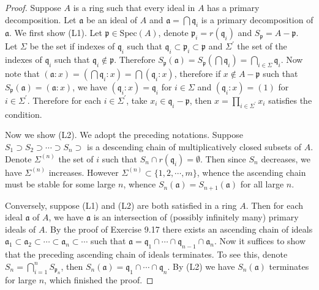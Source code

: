 \begin{proof}
Suppose $A$ is a ring such that every ideal in $A$ has a primary decomposition. Let $\mathfrak{a}$ be an ideal of $A$ and $\mathfrak{a}=\bigcap\mathfrak{q}_i$ is a primary decomposition of $\mathfrak{a}$. We first show (L1). Let $\mathfrak{p}\in\mathrm{Spec}(A)$, denote $\mathfrak{p}_i=r(\mathfrak{q}_i)$ and $S_\mathfrak{p}=A-\mathfrak{p}$. Let $\Sigma$ be the set if indexes of $\mathfrak{q}_i$ such that $\mathfrak{q}_i\subset\mathfrak{p}_i\subset\mathfrak{p}$ and $\Sigma^\prime$ the set of the indexes of $\mathfrak{q}_i$ such that $\mathfrak{q}_i\notin\mathfrak{p}$. Therefore $S_{\mathfrak{p}}\left( \mathfrak{a} \right) =S_{\mathfrak{p}}\left( \bigcap{\mathfrak{q} _i} \right) =\bigcap_{i\in \Sigma}{\mathfrak{q} _i}$. Now note that $\left( \mathfrak{a} :x \right) =\left( \bigcap{\mathfrak{q} _i}:x \right) =\bigcap{\left( \mathfrak{q} _i:x \right)}$, therefore if $x\notin A-\mathfrak{p}$ such that $S_\mathfrak{p}(\mathfrak{a})=(\mathfrak{a}:x)$, we have $(\mathfrak{q}_i:x)=\mathfrak{q}_i$ for $i\in\Sigma$ and $(\mathfrak{q}_i:x)=(1)$ for $i\in\Sigma^\prime$. Therefore for each $i\in\Sigma^\prime$, take $x_i\in\mathfrak{q}_i-\mathfrak{p}$, then $x=\prod_{i\in\Sigma^\prime}x_i$ satisfies the condition.\par
Now we show (L2). We adopt the preceding notations. Suppose $S_1\supset S_2\supset\cdots\supset S_n\supset$ is a descending chain of multiplicatively closed subsets of $A$. Denote $\Sigma^{(n)}$ the set of $i$ such that $S_n\cap r(\mathfrak{q}_i)=\emptyset$. Then since $S_n$ decreases, we have $\Sigma^{(n)}$ increases. However $\Sigma^{(n)}\subset\{1,2,\cdots,m\}$, whence the ascending chain must be stable for some large $n$, whence $S_n(\mathfrak{a})=S_{n+1}(\mathfrak{a})$ for all large $n$.\par
Conversely, suppose (L1) and (L2) are both satisfied in a ring $A$. Then for each ideal $\mathfrak{a}$ of $A$, we have $\mathfrak{a}$ is an intersection of (possibly infinitely many) primary ideals of $A$. By the proof of Exercise 9.17 there exists an ascending chain of ideals $\mathfrak{a}_1\subset\mathfrak{a}_2\subset\cdots\subset\mathfrak{a}_n\subset\cdots$ such that $\mathfrak{a}=\mathfrak{q}_1\cap\cdots\cap\mathfrak{q}_{n-1}\cap\mathfrak{a}_n$. Now it suffices to show that the preceding ascending chain of ideals terminates. To see this, denote $S_n=\bigcap_{i=1}^nS_{\mathfrak{p}_n}$, then $S_n(\mathfrak{a})=\mathfrak{q}_1\cap\cdots\cap\mathfrak{q}_n$. By (L2) we have $S_n(\mathfrak{a})$ terminates for large $n$, which finished the proof.
\end{proof}